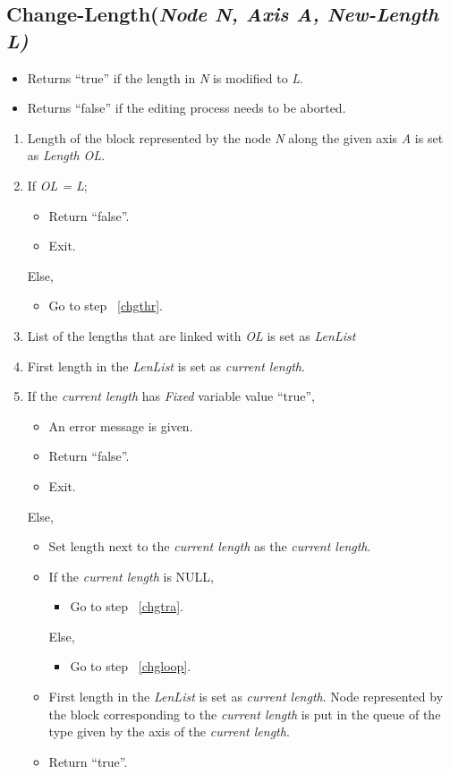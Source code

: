 	\subsection{Change-Length({\em Node N, Axis A, New-Length L)}}
	\label{chglen}
            \begin{itemize}
            \item
            Returns ``true'' if the length in {\em N} is modified to {\em L}.
            \item
            Returns ``false'' if the editing process needs to be aborted.
            \end{itemize}
	\begin{enumerate}
	\item
	Length of the block represented by the node {\em N} along the
	given axis {\em A} is set as {\em Length OL}.
	\item
	If {\em OL = L}; 
		\begin{itemize}
		\item
		Return ``false''.
		\item
		Exit.
		\end{itemize}
	Else,
		\begin{itemize}
		\item
		Go to step ~\ref{chgthr}.
		\end{itemize}
	\item
	\label{chgthr}
	List of the lengths that are linked with {\em OL} is set as {\em LenList}
	\item
	First length in the {\em LenList} is set as {\em current length}.
	\item
	\label{chgloop}
	If the {\em current length} has {\em Fixed} variable value ``true'',
			\begin{itemize}
			\item
			An error message is given.
			\item
			Return ``false''.
			\item
			Exit.
			\end{itemize}
	Else,
		\begin{itemize}
		\item
		Set length next to the {\em current length} as the {\em current length}.
		\item
		If the {\em current length} is NULL,
			\begin{itemize}
			\item
			Go to step ~\ref{chgtra}.
			\end{itemize}
		Else,
			\begin{itemize}
			\item
			Go to step ~\ref{chgloop}.
			\end{itemize}
		\item
		\label{chgtra}
		First length in the {\em LenList} is set as {\em current length}.
		Node represented by the block corresponding to the {\em current
		length} is put in the queue of the type given by the
		axis of the {\em current length}.
		\item
		Return ``true''.
		\end{itemize}
	\end{enumerate}

